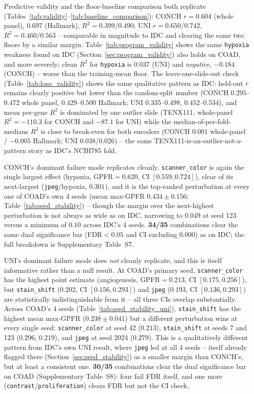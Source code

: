 \documentclass[11pt]{article}
\begin{document}
Predictive validity and the floor-baseline comparison both replicate (Tables~\ref{tab:validity}--\ref{tab:baseline_comparison}): CONCH $r=0.604$ (whole panel), $0.697$ (Hallmark), $R^2=0.399/0.490$; UNI $r=0.650$/$0.742$, $R^2=0.460/0.563$ -- comparable in magnitude to IDC and clearing the same two floors by a similar margin. Table~\ref{tab:program_validity} shows the same \texttt{hypoxia} weakness found on IDC (Section~\ref{sec:program_validity}) also holds on COAD, and more severely: clean $R^2$ for \texttt{hypoxia} is $0.037$ (UNI) and \emph{negative}, $-0.184$ (CONCH) -- worse than the training-mean floor. The leave-one-slide-out check (Table~\ref{tab:loso_validity}) shows the same qualitative pattern as IDC: held-out $r$ remains clearly positive but lower than the random-split number (CONCH $0.295$--$0.472$ whole panel, $0.429$--$0.500$ Hallmark; UNI $0.335$--$0.498$, $0.452$--$0.534$), and mean per-gene $R^2$ is dominated by one outlier slide (TENX111, whole-panel $R^2=-110.3$ for CONCH and $-87.1$ for UNI) while the median-of-per-fold-medians $R^2$ is close to break-even for both encoders (CONCH $0.001$ whole-panel / $-0.005$ Hallmark; UNI $0.038$/$0.026$) -- the same TENX111-is-an-outlier-not-a-pattern story as IDC's NCBI785 fold.

CONCH's dominant failure mode replicates cleanly. \texttt{scanner\_color} is again the single largest effect (hypoxia, GPFR$=0.620$, CI $[0.559, 0.724]$), clear of its next-largest (\texttt{jpeg}/hypoxia, $0.301$), and it is the top-ranked perturbation at every one of COAD's own 4 seeds (mean max-GPFR $0.434\pm0.156$; Table~\ref{tab:seed_stability}) -- though the margin over the next-highest perturbation is not always as wide as on IDC, narrowing to $0.049$ at seed 123 versus a minimum of $0.10$ across IDC's 4 seeds. \textbf{34/35} combinations clear the same dual significance bar (FDR$<0.05$ and CI excluding 0.000) as on IDC; the full breakdown is Supplementary Table~S7.

UNI's dominant failure mode does \emph{not} cleanly replicate, and this is itself informative rather than a null result. At COAD's primary seed, \texttt{scanner\_color} has the highest point estimate (angiogenesis, GPFR$=0.213$, CI $[0.175, 0.256]$), but \texttt{stain\_shift} ($0.202$, CI $[0.156, 0.293]$) and \texttt{jpeg} ($0.193$, CI $[0.136, 0.293]$) are statistically indistinguishable from it -- all three CIs overlap substantially. Across COAD's 4 seeds (Table~\ref{tab:seed_stability_uni}), \texttt{stain\_shift} has the highest mean max-GPFR ($0.238\pm0.041$) but a different perturbation wins at every single seed: \texttt{scanner\_color} at seed 42 ($0.213$), \texttt{stain\_shift} at seeds 7 and 123 ($0.296$, $0.219$), and \texttt{jpeg} at seed 2024 ($0.279$). This is a qualitatively different pattern from IDC's own UNI result, where \texttt{jpeg} led at all 4 seeds -- itself already flagged there (Section~\ref{sec:seed_stability}) as a smaller margin than CONCH's, but at least a consistent one. \textbf{30/35} combinations clear the dual significance bar on COAD (Supplementary Table~S8): four fail FDR itself, and one more (\texttt{contrast}/\texttt{proliferation}) clears FDR but not the CI check.
\end{document}
